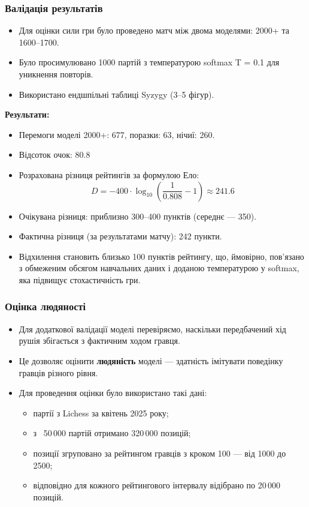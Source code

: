 \documentclass[
    10pt,
]{beamer}
\begin{document}
\begin{frame}[t]
    \frametitle{Валідація результатів}

    \begin{itemize}
        \item Для оцінки сили гри було проведено матч між двома моделями: 2000+ та 1600--1700.
        \item Було просимулювано 1000 партій з температурою softmax T = 0.1 для уникнення повторів.
        \item Використано ендшпільні таблиці Syzygy (3–5 фігур).
    \end{itemize}

    \vspace{2mm}
    \textbf{Результати:}
    \begin{itemize}
        \item Перемоги моделі 2000+: 677, поразки: 63, нічиї: 260.
        \item Відсоток очок: 80.8%
        \item Розрахована різниця рейтингів за формулою Ело:
        \[
        D = -400 \cdot \log_{10} \left( \frac{1}{0.808} - 1 \right) \approx 241.6
        \]
        \item Очікувана різниця: приблизно 300–400 пунктів (середнє — 350).
        \item Фактична різниця (за результатами матчу): 242 пункти.
        \item Відхилення становить близько 100 пунктів рейтингу, що, ймовірно, пов’язано з обмеженим обсягом навчальних даних і доданою температурою у softmax, яка підвищує стохастичність гри.
    \end{itemize}
\end{frame}




\begin{frame}[t]
    \frametitle{Оцінка людяності}

    \begin{itemize}
        \item Для додаткової валідації моделі перевіряємо, наскільки передбачений хід рушія збігається з фактичним ходом гравця.
        \item Це дозволяє оцінити \textbf{людяність} моделі — здатність імітувати поведінку гравців різного рівня.
        \item Для проведення оцінки було використано такі дані:
        \begin{itemize}
            \item партії з Lichess за квітень 2025 року;
            \item з ~50\,000 партій отримано 320\,000 позицій;
            \item позиції згруповано за рейтингом гравців з кроком 100 — від 1000 до 2500;
            \item відповідно для кожного рейтингового інтервалу відібрано по 20\,000 позицій.
        \end{itemize}
    \end{itemize}
\end{frame}
\end{document}
